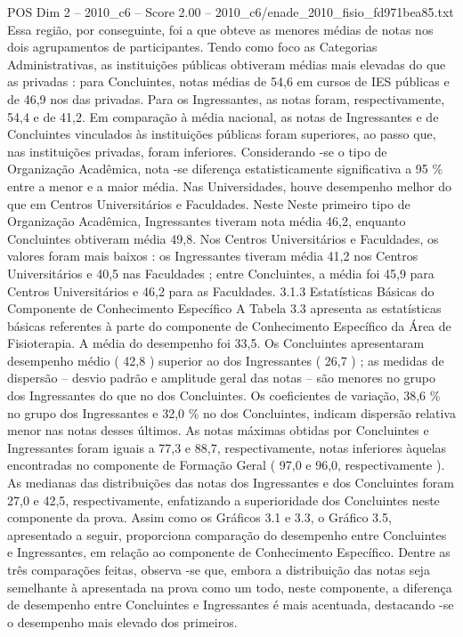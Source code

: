 \begin{textsample}{POS Dim 2 – 2010\_c6 – Score 2.00 – 2010\_c6/enade\_2010\_fisio\_fd971bea85.txt}
Essa região, por conseguinte, foi a que obteve as menores médias de notas nos dois agrupamentos de participantes.
Tendo como foco as Categorias Administrativas, as instituições públicas obtiveram médias mais elevadas do que as privadas : para Concluintes, notas médias de 54,6 em cursos de IES públicas e de 46,9 nos das privadas.
Para os Ingressantes, as notas foram, respectivamente, 54,4 e de 41,2.
Em comparação à média nacional, as notas de Ingressantes e de Concluintes vinculados às instituições públicas foram superiores, ao passo que, nas instituições privadas, foram inferiores.
Considerando -se o tipo de Organização Acadêmica, nota -se diferença estatisticamente significativa a 95 \% entre a menor e a maior média.
Nas Universidades, houve desempenho melhor do que em Centros Universitários e Faculdades.
Neste Neste primeiro tipo de Organização Acadêmica, Ingressantes tiveram nota média 46,2, enquanto Concluintes obtiveram média 49,8.
Nos Centros Universitários e Faculdades, os valores foram mais baixos : os Ingressantes tiveram média 41,2 nos Centros Universitários e 40,5 nas Faculdades ; entre Concluintes, a média foi 45,9 para Centros Universitários e 46,2 para as Faculdades. 3.1.3 Estatísticas Básicas do Componente de Conhecimento Específico A Tabela 3.3 apresenta as estatísticas básicas referentes à parte do componente de Conhecimento Específico da Área de Fisioterapia.
A média do desempenho foi 33,5.
Os Concluintes apresentaram desempenho médio ( 42,8 ) superior ao dos Ingressantes ( 26,7 ) ; as medidas de dispersão – desvio padrão e amplitude geral das notas – são menores no grupo dos Ingressantes do que no dos Concluintes.
Os coeficientes de variação, 38,6 \% no grupo dos Ingressantes e 32,0 \% no dos Concluintes, indicam dispersão relativa menor nas notas desses últimos.
As notas máximas obtidas por Concluintes e Ingressantes foram iguais a 77,3 e 88,7, respectivamente, notas inferiores àquelas encontradas no componente de Formação Geral ( 97,0 e 96,0, respectivamente ).
As medianas das distribuições das notas dos Ingressantes e dos Concluintes foram 27,0 e 42,5, respectivamente, enfatizando a superioridade dos Concluintes neste componente da prova.
Assim como os Gráficos 3.1 e 3.3, o Gráfico 3.5, apresentado a seguir, proporciona comparação do desempenho entre Concluintes e Ingressantes, em relação ao componente de Conhecimento Específico.
Dentre as três comparações feitas, observa -se que, embora a distribuição das notas seja semelhante à apresentada na prova como um todo, neste componente, a diferença de desempenho entre Concluintes e Ingressantes é mais acentuada, destacando -se o desempenho mais elevado dos primeiros.

\end{textsample}
